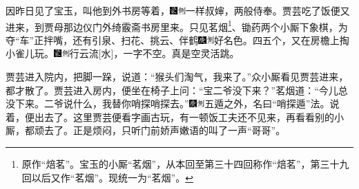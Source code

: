 因昨日见了宝玉，叫他到外书房等着，{\includegraphics[width=3mm]{../Images/00006}\includegraphics[width=3mm]{../Images/00011}\footnotesize \kaishu 一样叔婶，两般侍奉。}贾芸吃了饭便又进来，到贾母那边仪门外绮霰斋书房里来。只见茗烟\footnote{原作“焙茗”。宝玉的小厮“茗烟”，从本回至第三十四回称作“焙茗”，第三十九回以后又作“茗烟”。现统一为“茗烟”。}、锄药两个小厮下象棋，为夺“车”正拌嘴，还有引泉、扫花、挑云、伴鹤{\includegraphics[width=3mm]{../Images/00004}\includegraphics[width=3mm]{../Images/00011}\footnotesize \kaishu 好名色。}四五个，又在房檐上掏小雀儿玩。{\includegraphics[width=3mm]{../Images/00006}\includegraphics[width=3mm]{../Images/00011}\footnotesize \kaishu 行云流{[}水{]}，一字不空。真是空灵活跳。}

贾芸进入院内，把脚一跺，说道：“猴头们淘气，我来了。”众小厮看见贾芸进来，都才散了。贾芸进入房内，便坐在椅子上问：“宝二爷没下来？”茗烟道：“今儿总没下来。二爷说什么，我替你哨探哨探去。”{\includegraphics[width=3mm]{../Images/00004}\includegraphics[width=3mm]{../Images/00011}\footnotesize \kaishu 五遁之外，名曰“哨探遁”法。}说着，便出去了。这里贾芸便看字画古玩，有一顿饭工夫还不见来，再看看别的小厮，都顽去了。正是烦闷，只听门前娇声嫩语的叫了一声“哥哥”。

